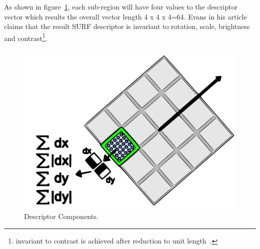 \begin{enumerate}
\begin{itemize}
	
As shown in figure~\ref{fig:descriptor-components}, each sub-region will have four values to the descriptor vector which results the overall vector length 4 x 4 x 4=64. Evans in his article~\cite{Evans:09} claims that the result SURF descriptor is invariant to rotation, scale, brightness and contrast\footnote{invariant to contrast is achieved after reduction to unit length~\cite{Evans:09}.}.
\begin{figure}[H]%
	   \includegraphics[width=\columnwidth]{2.mainmatter/2.Methodology/FeaturesExtraction/figures/SURF/descriptor-components}%
	   \caption[Descriptor Components]{Descriptor Components.  }%
	   \label{fig:descriptor-components}%
\end{figure}	
	
	
\end{itemize}


\end{enumerate}